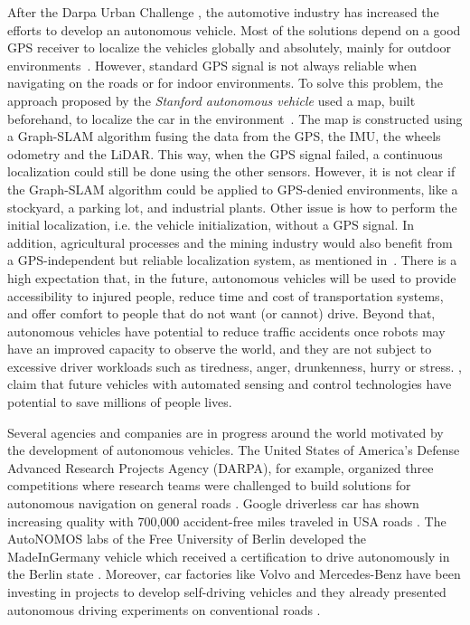 After the Darpa Urban Challenge \cite{DBLP:conf/darpa/2009},  the automotive industry has increased the efforts to develop an autonomous vehicle. Most of the solutions depend on a good GPS receiver to localize the vehicles globally and absolutely, mainly for outdoor environments~\cite{bacha2008odin,leonard2008perception,Montemerlo:2008:JSE:1405647.1405651,Urmson:2008:ADU:1395073.1395077,Auat2013}. However, standard GPS signal is not always reliable when navigating on the roads or for indoor environments. To solve this problem, the approach proposed by the \emph{Stanford autonomous vehicle} used a map, built beforehand, to localize the car in the environment~\cite{Levinson-RSS-07,LevinsonT10}. The map is constructed using a Graph-SLAM algorithm fusing the data from the GPS, the IMU, the wheels odometry and the LiDAR. This way, when the GPS signal failed, a continuous localization could still be done using the other sensors.  However, it is not clear if the Graph-SLAM algorithm could be applied to GPS-denied 
environments, like a stockyard, a parking lot, and industrial plants. Other issue is how to perform the initial localization, i.e. the vehicle initialization, without a GPS signal. In addition, agricultural processes and the mining industry would also benefit from a GPS-independent but reliable localization system, as mentioned in~\cite{Auat2013}.
There is a high expectation that, in the future, autonomous vehicles will be used to provide accessibility to injured people, reduce time and cost of transportation systems, and offer comfort to people that do not want (or cannot) drive. Beyond that, autonomous vehicles have potential to reduce traffic accidents once robots may have an improved capacity to observe the world, and they are not subject to excessive driver workloads such as tiredness, anger, drunkenness, hurry or stress. \cite{01DARPAUrban2007}, claim that future vehicles with automated sensing and control technologies have potential to save millions of people lives.

Several  agencies and companies are in progress around the world motivated by the development of autonomous vehicles. The United States of America's Defense Advanced Research Projects Agency (DARPA), for example, organized three competitions where research teams were challenged to build solutions for autonomous  navigation on general roads \cite{01DARPAUrban2007,02DARPAGrand2005}. Google driverless car has shown increasing quality with 700,000 accident-free miles traveled in USA roads \cite{03urmson2012self}. The AutoNOMOS labs of the Free University of Berlin developed the MadeInGermany vehicle which received a certification to drive autonomously in the Berlin state \cite{04AutoNOMOS}. Moreover, car factories like Volvo and Mercedes-Benz have been investing in projects to develop self-driving vehicles and they already presented autonomous driving experiments on conventional roads \cite{05Volvo,06Mercedes-Benz}.

